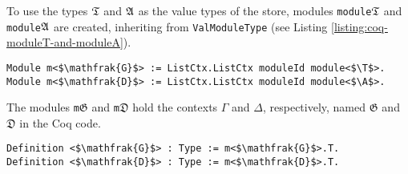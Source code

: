To use the types $\mathfrak{T}$ and $\mathfrak{A}$ as the value types of the store, modules \texttt{module}$\mathfrak{T}$ and \texttt{module}$\mathfrak{A}$ are created, inheriting from \texttt{ValModuleType} (see Listing \ref{listing:coq-moduleT-and-moduleA}).

\begin{verbatim}
Module m<$\mathfrak{G}$> := ListCtx.ListCtx moduleId module<$\T$>.
Module m<$\mathfrak{D}$> := ListCtx.ListCtx moduleId module<$\A$>.
\end{verbatim}

The modules \texttt{m}$\mathfrak{G}$ and \texttt{m}$\mathfrak{D}$ hold the contexts $\Gamma$ and $\Delta$, respectively, named $\mathfrak{G}$ and $\mathfrak{D}$ in the Coq code.

\begin{verbatim}
Definition <$\mathfrak{G}$> : Type := m<$\mathfrak{G}$>.T.
Definition <$\mathfrak{D}$> : Type := m<$\mathfrak{D}$>.T.
\end{verbatim}